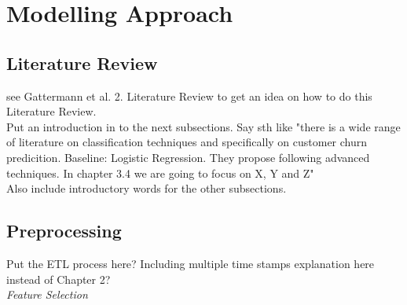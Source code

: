 \documentclass[12pt,titlepage]{article}
\begin{document}
\section{Modelling Approach} \par

\subsection{Literature Review} \par

see Gattermann et al. 2. Literature Review to get an idea on how to do this Literature Review. \\
Put an introduction in to the next subsections. Say sth like "there is a wide range of literature on classification techniques and specifically on customer churn predicition.
Baseline: Logistic Regression. They propose following advanced techniques. In chapter 3.4 we are going to focus on X, Y and Z" \\
Also include introductory words for the other subsections. \\

\subsection{Preprocessing} \par

Put the ETL process here? Including multiple time stamps explanation here instead of Chapter 2? \\

\textit{Feature Selection}
\end{document}
